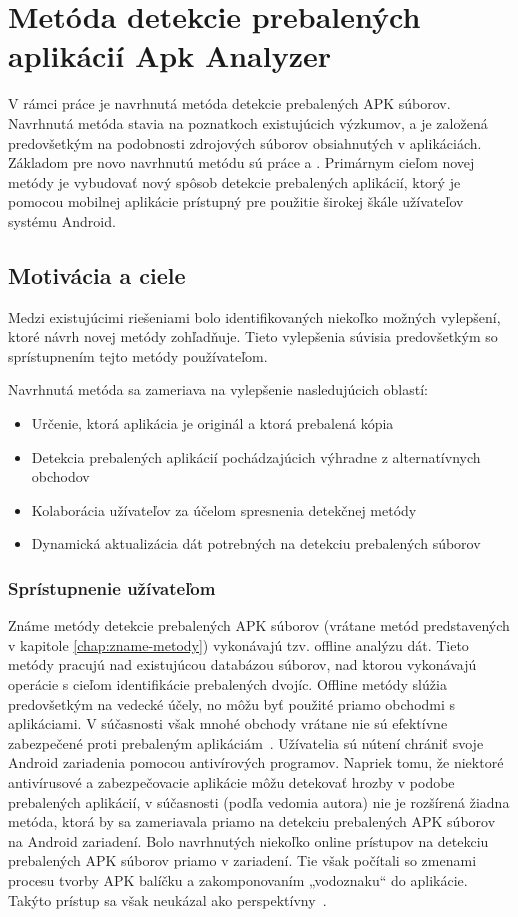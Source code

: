 \chapter{Metóda detekcie prebalených aplikácií Apk Analyzer}
\label{chap:metoda-detekcie-apk-analyzer}
V rámci práce je navrhnutá metóda detekcie prebalených APK súborov. Navrhnutá metóda stavia na poznatkoch existujúcich výzkumov, a je založená predovšetkým na podobnosti zdrojových súborov obsiahnutých v aplikáciách. Základom pre novo navrhnutú metódu sú práce  a . Primárnym cieľom novej metódy je vybudovať nový spôsob detekcie prebalených aplikácií, ktorý je pomocou mobilnej aplikácie prístupný pre použitie širokej škále užívateľov systému Android.

\section{Motivácia a ciele}

Medzi existujúcimi riešeniami bolo identifikovaných niekoľko možných vylepšení, ktoré návrh novej metódy zohľadňuje. Tieto vylepšenia súvisia predovšetkým so sprístupnením tejto metódy používateľom. 

\noindent Navrhnutá metóda sa zameriava na vylepšenie nasledujúcich oblastí:
\begin{itemize}
	\item Určenie, ktorá aplikácia je originál a ktorá prebalená kópia
	\item Detekcia prebalených aplikácií pochádzajúcich výhradne z alternatívnych obchodov
	\item Kolaborácia užívateľov za účelom spresnenia detekčnej metódy
	\item Dynamická aktualizácia dát potrebných na detekciu prebalených súborov
\end{itemize}

\subsection*{Sprístupnenie užívateľom}

Známe metódy detekcie prebalených APK súborov (vrátane metód predstavených v kapitole \ref{chap:zname-metody}) vykonávajú tzv. offline analýzu dát. Tieto metódy pracujú nad existujúcou databázou súborov, nad ktorou vykonávajú operácie s cieľom identifikácie prebalených dvojíc. Offline metódy slúžia predovšetkým na vedecké účely, no môžu byť použité priamo obchodmi s aplikáciami. V súčasnosti však mnohé obchody vrátane  nie sú efektívne zabezpečené proti prebaleným aplikáciám~\cite{Zhauniarovich2013}. Užívatelia sú nútení chrániť svoje Android zariadenia pomocou antivírových programov. Napriek tomu, že niektoré antivírusové a zabezpečovacie aplikácie môžu detekovať hrozby v podobe prebalených aplikácií, v súčasnosti (podľa vedomia autora) nie je rozšírená žiadna metóda, ktorá by sa zameriavala priamo na detekciu prebalených APK súborov  na Android zariadení. Bolo navrhnutých niekoľko online prístupov na detekciu prebalených APK súborov priamo v zariadení. Tie však počítali so zmenami procesu tvorby APK balíčku a zakomponovaním „vodoznaku“ do aplikácie. Takýto prístup sa však neukázal ako perspektívny~\cite{Rastogi2016}.


